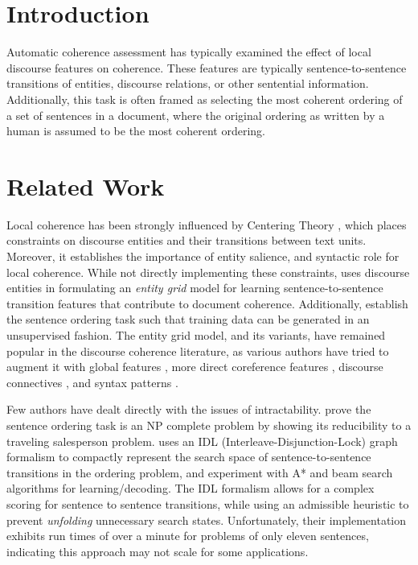 \documentclass{article}
\begin{document}
\section{Introduction}



Automatic coherence assessment has typically examined the effect of local discourse features on coherence. These features are typically sentence-to-sentence transitions of entities, discourse relations, or other sentential information. 
Additionally, this task is often framed as selecting the most coherent ordering of a set of sentences in a document, where the original ordering as written by a human is assumed to be the most coherent ordering.


\section{Related Work}


Local coherence has been strongly influenced by Centering Theory \cite{grosz1995centering}, which places constraints on discourse entities and their transitions between text units.
Moreover, it establishes the importance of entity salience, and syntactic role for local coherence. 
While not directly implementing these constraints, \cite{barzilay2005modeling} uses discourse entities in formulating an \textit{entity grid} model for learning sentence-to-sentence transition features that contribute to document coherence. 
Additionally, \cite{barzilay2005modeling} establish the sentence ordering task such that training data can be generated in an unsupervised fashion.   
The entity grid model, and its variants, have remained popular in the discourse coherence literature, as various authors have tried to augment it with global features \cite{elsner2007unified}, more direct coreference features \cite{elsner2008coreference}, discourse connectives \cite{lin2011automatically}, and syntax patterns \cite{louis2012coherence}.  


Few authors have dealt directly with the issues of intractability. 
\cite{althaus2004computing} prove the sentence ordering task is an NP complete problem by showing its reducibility to a traveling salesperson problem. 
\cite{soricut2006discourse} uses an IDL (Interleave-Disjunction-Lock) graph formalism to compactly represent the search space of sentence-to-sentence transitions in the ordering problem, and experiment with A* and beam search algorithms for learning/decoding.                    
The IDL formalism allows for a complex scoring for sentence to sentence transitions, while using an admissible heuristic to prevent \textit{unfolding} unnecessary search states. 
Unfortunately, their implementation exhibits run times of over a minute for problems of only eleven sentences, indicating this approach may not scale for some applications.
\end{document}

